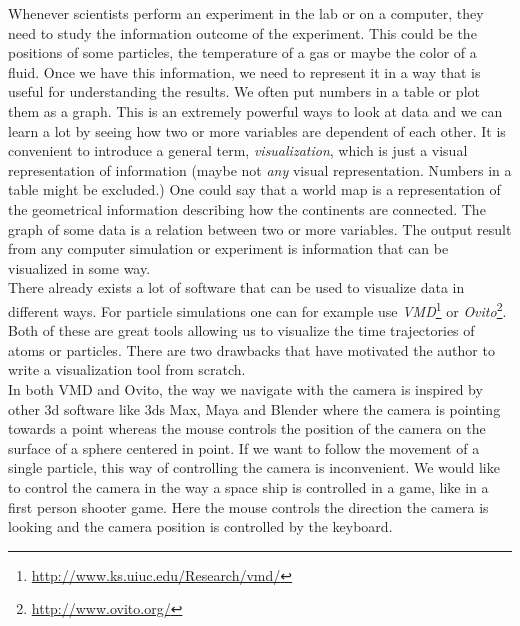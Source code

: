 Whenever scientists perform an experiment in the lab or on a computer, they need to study the information outcome of the experiment. This could be the positions of some particles, the temperature of a gas or maybe the color of a fluid. Once we have this information, we need to represent it in a way that is useful for understanding the results. We often put numbers in a table or plot them as a graph. This is an extremely powerful ways to look at data and we can learn a lot by seeing how two or more variables are dependent of each other. It is convenient to introduce a general term, \textit{visualization}, which is just a visual representation of information (maybe not \textit{any} visual representation. Numbers in a table might be excluded.) One could say that a world map is a representation of the geometrical information describing how the continents are connected. The graph of some data is a relation between two or more variables. The output result from any computer simulation or experiment is information that can be visualized in some way.\\
There already exists a lot of software that can be used to visualize data in different ways. For particle simulations one can for example use \textit{VMD}\footnote{\url{http://www.ks.uiuc.edu/Research/vmd/}} or \textit{Ovito}\footnote{\url{http://www.ovito.org/}}. Both of these are great tools allowing us to visualize the time trajectories of atoms or particles. There are two drawbacks that have motivated the author to write a visualization tool from scratch.\\
In both VMD and Ovito, the way we navigate with the camera is inspired by other 3d software like 3ds Max, Maya and Blender where the camera is pointing towards a point whereas the mouse controls the position of the camera on the surface of a sphere centered in point. If we want to follow the movement of a single particle, this way of controlling the camera is inconvenient. We would like to control the camera in the way a space ship is controlled in a game, like in a first person shooter game. Here the mouse controls the direction the camera is looking and the camera position is controlled by the keyboard.\\
